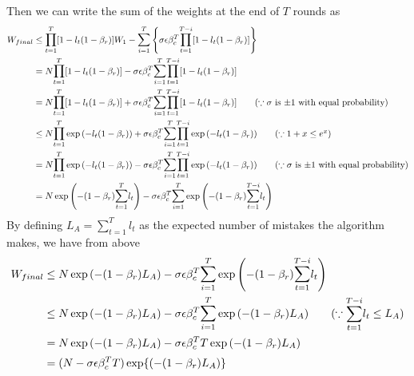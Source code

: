 \documentclass[12pt]{article}
\begin{document}
\noindent Then we can write the sum of the weights at the end of $T$ rounds as
\begin{align*}
W_{final} &\leq\Prod_{t=1}^T[1-l_t(1-\beta_r)]W_1 - \Sum_{i=1}^T\left\{\sigma\epsilon\beta_c^T\Prod_{t=1}^{T-i}[1-l_t(1-\beta_r)]\right\}\\
&=N\Prod_{t=1}^T[1-l_t(1-\beta_r)] - \sigma\epsilon\beta_c^T\Sum_{i=1}^T\Prod_{t=1}^{T-i}[1-l_t(1-\beta_r)]\\
&=N\Prod_{t=1}^T[1-l_t(1-\beta_r)] + \sigma\epsilon\beta_c^T\Sum_{i=1}^T\Prod_{t=1}^{T-i}[1-l_t(1-\beta_r)]\tag{$\because \sigma$ is $\pm1$ with equal probability}\\
&\leq N\Prod_{t=1}^T\exp{\left(-l_t(1-\beta_r)\right)} + \sigma\epsilon\beta_c^T\Sum_{i=1}^T\Prod_{t=1}^{T-i}\exp{\left(-l_t(1-\beta_r)\right)}
\tag{$\because1+x\leq e^x$}\\
&= N\Prod_{t=1}^T\exp{\left(-l_t(1-\beta_r)\right)} - \sigma\epsilon\beta_c^T\Sum_{i=1}^T\Prod_{t=1}^{T-i}\exp{\left(-l_t(1-\beta_r)\right)}
\tag{$\because \sigma$ is $\pm1$ with equal probability}\\
&= N\exp{\left(-(1-\beta_r)\Sum_{t=1}^Tl_t\right)} - \sigma\epsilon\beta_c^T\Sum_{i=1}^T\exp{\left(-(1-\beta_r)\Sum_{t=1}^{T-i}l_t\right)}
\end{align*}
\noindent By defining $L_A=\sum_{t=1}^Tl_t$ as the expected number of mistakes the algorithm makes, we have from above
\begin{align}
W_{final} &\leq N\exp{\left(-(1-\beta_r)L_A\right)} - \sigma\epsilon\beta_c^T\Sum_{i=1}^T\exp{\left(-(1-\beta_r)\Sum_{t=1}^{T-i}l_t\right)}\tag*{}\\
&\leq N\exp{\left(-(1-\beta_r)L_A\right)} - \sigma\epsilon\beta_c^T\Sum_{i=1}^T\exp{\left(-(1-\beta_r)L_A\right)}
\tag{$\because\Sum_{t=1}^{T-i}l_t\leq L_A$}\\
&= N\exp{\left(-(1-\beta_r)L_A\right)} - \sigma\epsilon\beta_c^TT\exp{\left(-(1-\beta_r)L_A\right)}\tag*{}\\
&= (N - \sigma\epsilon\beta_c^TT)\exp\{\left(-(1-\beta_r)L_A\right)\}
\label{eq:w-final}
\end{align}
\noindent 
\end{document}
